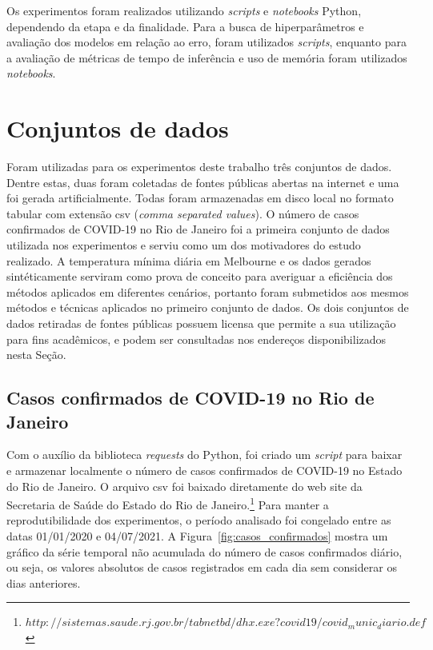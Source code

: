 Os experimentos foram realizados utilizando \textit{scripts} e \textit{notebooks} Python, dependendo da etapa e da finalidade. Para a busca de hiperparâmetros e avaliação dos modelos em relação ao erro, foram utilizados \textit{scripts}, enquanto para a avaliação de métricas de tempo de inferência e uso de memória foram utilizados \textit{notebooks}.

\section{Conjuntos de dados}
Foram utilizadas para os experimentos deste trabalho três conjuntos de dados. Dentre estas, duas foram coletadas de fontes públicas abertas na internet e uma foi gerada artificialmente. Todas foram armazenadas em disco local no formato tabular com extensão csv (\textit{comma separated values}). O número de casos confirmados de COVID-19 no Rio de Janeiro foi a primeira conjunto de dados utilizada nos experimentos e serviu como um dos motivadores do estudo realizado. A temperatura mínima diária em Melbourne e os dados gerados sintéticamente serviram como prova de conceito para averiguar a eficiência dos métodos aplicados em diferentes cenários, portanto foram submetidos aos mesmos métodos e técnicas aplicados no primeiro conjunto de dados. Os dois conjuntos de dados retiradas de fontes públicas possuem licensa que permite a sua utilização para fins acadêmicos, e podem ser consultadas nos endereços disponibilizados nesta Seção.

\subsection{Casos confirmados de COVID-19 no Rio de Janeiro}\label{subsec:casos_confirmados}
Com o auxílio da biblioteca \textit{requests} do Python, foi criado um \textit{script} para baixar e armazenar localmente o número de casos confirmados de COVID-19 no Estado do Rio de Janeiro. O arquivo csv foi baixado diretamente do web site da Secretaria de Saúde do Estado do Rio de Janeiro.\footnote{$http://sistemas.saude.rj.gov.br/tabnetbd/dhx.exe?covid19/covid_munic_diario.def$} Para manter a reprodutibilidade dos experimentos, o período analisado foi congelado entre as datas 01/01/2020 e 04/07/2021. A Figura~\ref{fig:casos_confirmados} mostra um gráfico da série temporal não acumulada do número de casos confirmados diário, ou seja, os valores absolutos de casos registrados em cada dia sem considerar os dias anteriores.

